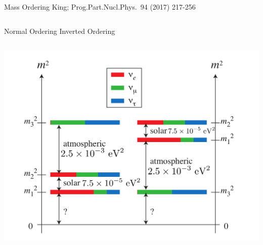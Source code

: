 \documentclass[]{beamer}
\begin{document}
\begin{frame}{Mass Ordering}{}
	{\tiny King; Prog.Part.Nucl.Phys.\ 94 (2017) 217-256~\cite{king}}
	\begin{columns}[c]
		\centering
		Normal Ordering
		\centering
		Inverted Ordering
	\end{columns}
	\centering
	\includegraphics[height=.8\textheight]{nu-detection/mass}
\end{frame}
\end{document}
